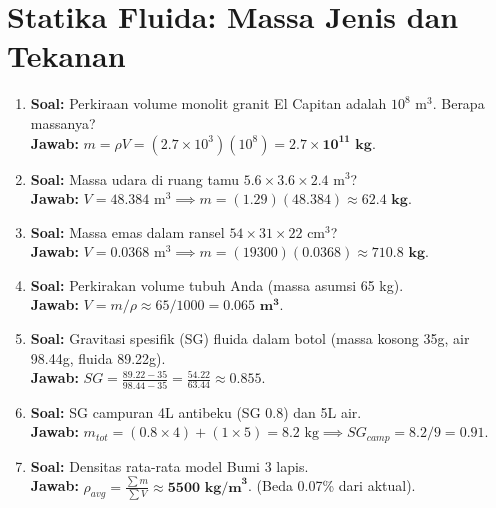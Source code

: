 \documentclass{article}
\begin{document}
\section{Statika Fluida: Massa Jenis dan Tekanan}

\begin{enumerate}[label=\textbf{\arabic*.}]

    \item \textbf{Soal:} Perkiraan volume monolit granit El Capitan adalah $10^8 \text{ m}^3$. Berapa massanya? \\
    \textbf{Jawab:} $m = \rho V = (2.7 \times 10^3)(10^8) = \mathbf{2.7 \times 10^{11} \text{ kg}}$.

    \item \textbf{Soal:} Massa udara di ruang tamu $5.6 \times 3.6 \times 2.4 \text{ m}^3$? \\
    \textbf{Jawab:} $V = 48.384 \text{ m}^3 \implies m = (1.29)(48.384) \approx \mathbf{62.4 \text{ kg}}$.

    \item \textbf{Soal:} Massa emas dalam ransel $54 \times 31 \times 22 \text{ cm}^3$? \\
    \textbf{Jawab:} $V = 0.0368 \text{ m}^3 \implies m = (19300)(0.0368) \approx \mathbf{710.8 \text{ kg}}$.

    \item \textbf{Soal:} Perkirakan volume tubuh Anda (massa asumsi 65 kg). \\
    \textbf{Jawab:} $V = m/\rho \approx 65/1000 = \mathbf{0.065 \text{ m}^3}$.

    \item \textbf{Soal:} Gravitasi spesifik (SG) fluida dalam botol (massa kosong 35g, air 98.44g, fluida 89.22g). \\
    \textbf{Jawab:} $SG = \frac{89.22-35}{98.44-35} = \frac{54.22}{63.44} \approx \mathbf{0.855}$.

    \item \textbf{Soal:} SG campuran 4L antibeku (SG 0.8) dan 5L air. \\
    \textbf{Jawab:} $m_{tot} = (0.8 \times 4) + (1 \times 5) = 8.2 \text{ kg} \implies SG_{camp} = 8.2/9 = \mathbf{0.91}$.

    \item \textbf{Soal:} Densitas rata-rata model Bumi 3 lapis. \\
    \textbf{Jawab:} $\rho_{avg} = \frac{\sum m}{\sum V} \approx \mathbf{5500 \text{ kg/m}^3}$. (Beda 0.07\% dari aktual).


\end{enumerate}
\end{document}
